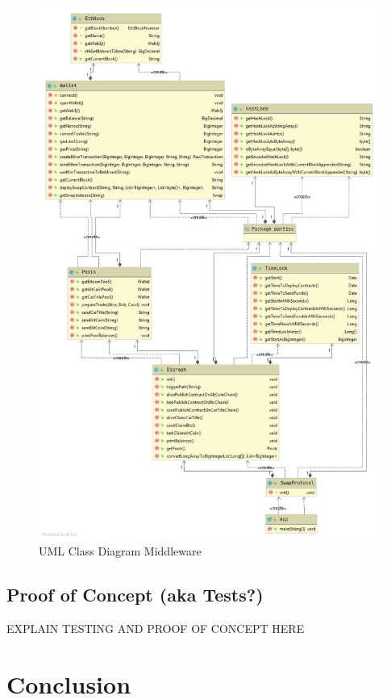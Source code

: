 \begin{figure}[h]
	\includegraphics[width=0.7\paperwidth]{swaps-crop}	%
	\caption{UML Class Diagram Middleware}
	\label{fig:uml}
\end{figure}
\clearpage

\section{Proof of Concept (aka Tests?)}
\label{sec:chapter04:poc}
EXPLAIN TESTING AND PROOF OF CONCEPT HERE

\chapter{Conclusion}
\label{ch:chapter05}

